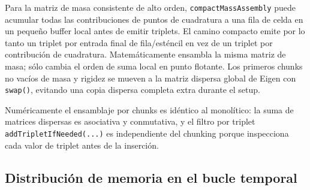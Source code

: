 \documentclass[11pt,a4paper]{article}
\newcommand{\code}[1]{\texttt{\small #1}}
\begin{document}
Para la matriz de masa consistente de alto orden, \code{compactMassAssembly} puede acumular
todas las contribuciones de puntos de cuadratura a una fila de celda en un pequeño buffer
local antes de emitir triplets. El camino compacto emite por lo tanto un triplet por entrada
final de fila/esténcil en vez de un triplet por contribución de cuadratura. Matemáticamente
ensambla la misma matriz de masa; sólo cambia el orden de suma local en punto flotante. Los
primeros chunks no vacíos de masa y rigidez se mueven a la matriz dispersa global de Eigen con
\code{swap()}, evitando una copia dispersa completa extra durante el setup.

Numéricamente el ensamblaje por chunks es idéntico al monolítico: la suma de matrices dispersas
es asociativa y conmutativa, y el filtro por triplet \code{addTripletIfNeeded(...)} es
independiente del chunking porque inspecciona cada valor de triplet antes de la inserción.

\subsection{Distribución de memoria en el bucle temporal}
\label{sec:memoria-loop}
\end{document}
